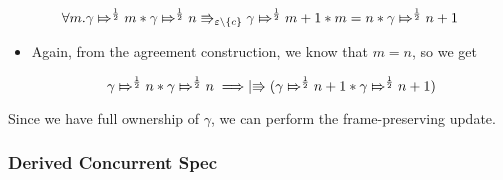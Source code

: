 \begin{itemize}
\[
\forall m. \apointsto{\gamma}{m}{\frac{1}{2}} * \apointsto{\gamma}{n}{\frac{1}{2}} \Rrightarrow_{\varepsilon \backslash \{c\}} \apointsto{\gamma}{m + 1}{\frac{1}{2}} * m = n * \apointsto{\gamma}{n + 1}{\frac{1}{2}}
\]

\begin{itemize}
\item Again, from the agreement construction, we know that $m = n$, so we get

\[
\apointsto{\gamma}{n}{\frac{1}{2}} * \apointsto{\gamma}{n}{\frac{1}{2}} \implies \upmod{ (\apointsto{\gamma}{n + 1}{\frac{1}{2}} * \apointsto{\gamma}{n + 1}{\frac{1}{2}}) }
\]
\end{itemize}

Since we have full ownership of $\gamma$, we can perform the frame-preserving update.

\end{itemize}

\subsubsection{Derived Concurrent Spec}